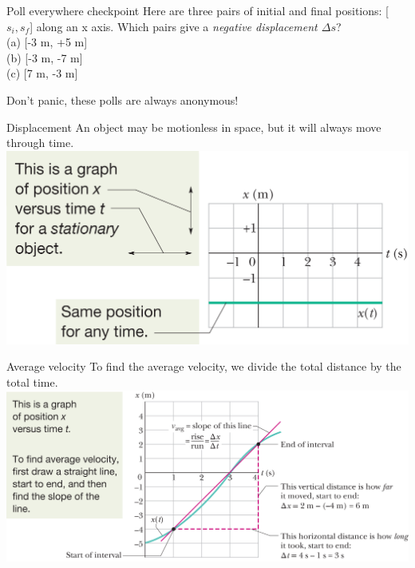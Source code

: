  \begin{frame}{Poll everywhere checkpoint }
 Here are three pairs of initial and final positions: [$s_i, s_f$] along an x axis. Which pairs give a \textit{negative displacement $\Delta s$}?\\[1ex]
 (a) [-3 m, +5 m]\\ 
 (b) [-3 m, -7 m]\\
 (c) [7 m, -3 m]\\[3ex]

 \vspace{0.5cm}
 
 Don't panic, these polls are always anonymous!
 
 
 \end{frame}
 
\begin{frame}{Displacement}
An object may be motionless in space, but it will always move through time.\\[2ex]
\centering
\includegraphics[scale=1.]{2.png}
\end{frame}


% 
\begin{frame}{Average velocity}
To find the average velocity, we divide the total distance by the total time.\\[2ex] 
\centering
\includegraphics[scale=0.8]{3.png}
\end{frame}


